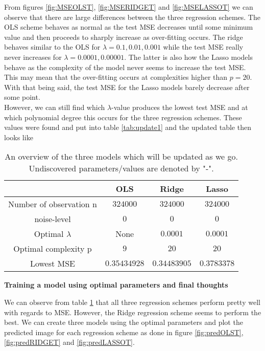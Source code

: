 \documentclass[12pt,a4paper]{article}
\begin{document}
\noindent From figures \ref{fig:MSEOLST}, \ref{fig:MSERIDGET} and \ref{fig:MSELASSOT} we can observe that there are large differences between the three regression schemes. The OLS scheme behaves as normal as the test MSE decreases until some minimum value and then proceeds to sharply increase as over-fitting occurs. The ridge behaves similar to the OLS for $\lambda = 0.1,0.01,0.001$ while the test MSE really never increases for $\lambda = 0.0001,0.00001$. The latter is also how the Lasso models behave as the complexity of the model never seems to increase the test MSE. This may mean that the over-fitting occurs at complexities higher than $p = 20$. With that being said, the test MSE for the Lasso models barely decrease after some point. 
\\
However, we can still find which $\lambda$-value produces the lowest test MSE and at which polynomial degree this occurs for the three regression schemes. These values were found and put into table \ref{tab:update1} and the updated table then looks like

\begin{table}[h]
\caption{\label{tab:update2} An overview of the three models which will be updated as we go. Undiscovered parameters/values are denoted by "-".}
\centering
\begin{tabular}{c|c|c|c}
 & OLS & Ridge & Lasso\\
\hline
Number of observation n & $324000$ & $324000$ & $324000$\\
\hline
noise-level & $0$ & $0$ & $0$\\
\hline
Optimal $\lambda$ & None & $0.0001$ & $0.0001$\\
\hline
Optimal complexity p & $9$ & $20$ & $20$\\
\hline
Lowest MSE & $0.35434928$ & $0.34483905$ & $0.3783378$\\
\end{tabular}
\end{table}

\begin{center}
\large{\textbf{Training a model using optimal parameters and final thoughts}}
\end{center}

\noindent We can observe from table \ref{tab:update2} that all three regression schemes perform pretty well with regards to MSE. However, the Ridge regression scheme seems to perform the best. We can create three models using the optimal parameters and plot the predicted image for each regression scheme as done in figure \ref{fig:predOLST}, \ref{fig:predRIDGET} and \ref{fig:predLASSOT}.
\end{document}
